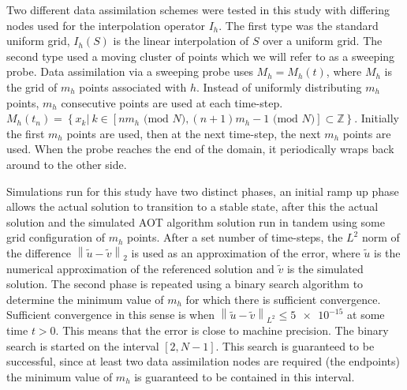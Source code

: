 \documentclass[12pt]{amsart}
\theoremstyle{plain}
\theoremstyle{definition}
\theoremstyle{remark}
\numberwithin{equation}{section} %
\numberwithin{figure}{section}   %
\newcommand{\field}[1]{\mathbb{#1}}
\newcommand{\nZ}{\field{Z}}
\newcommand{\norm}[1]{\left\|#1\right\|}
\begin{document}
Two different data assimilation schemes were tested in this study with differing nodes used for the interpolation operator $I_h$. The first type was the standard uniform grid, $I_h(S)$ is the linear interpolation of $S$ over a uniform grid. The second type used a moving cluster of points which we will refer to as a sweeping probe. Data assimilation via a sweeping probe uses $M_h = M_h(t)$, where $M_h$ is the grid of $m_h$ points associated with $h$. Instead of uniformly distributing $m_h$ points, $m_h$ consecutive points are used at each time-step. \\
 $M_h{(t_n)} = \left\{x_k |~ k\in [nm_h \text{ (mod } N),(n+1)m_h - 1 \text{ (mod } N)] \subset\nZ \right\}$. Initially the first $m_h$ points are used, then at the next time-step, the next $m_h$ points are used. When the probe reaches the end of the domain, it periodically wraps back around to the other side.  
 
Simulations run for this study have two distinct phases, an initial ramp up phase allows the actual solution to transition to a stable state, after this the actual solution and the simulated AOT algorithm solution run in tandem using some grid configuration of $m_h$ points. After a set number of time-steps, the $L^2$ norm of the difference $\norm{\tilde{u}-\tilde{v}}_{2}$ is used as an approximation of the error, where $\tilde{u}$ is the numerical approximation of the referenced solution and $\tilde{v}$ is the simulated solution. The second phase is repeated using a binary search algorithm to determine the minimum value of $m_h$ for which there is sufficient convergence. Sufficient convergence in this sense is when $\norm{\tilde{u}-\tilde{v}}_{L^2} \leq \num{5e-15}$ at some time $t>0$. This means that the error is close to machine precision. The binary search is started on the interval $\left[2,N-1\right]$. This search is guaranteed to be successful, since at least two data assimilation nodes are required (the endpoints) the minimum value of $m_h$ is guaranteed to be contained in this interval.
\end{document}
